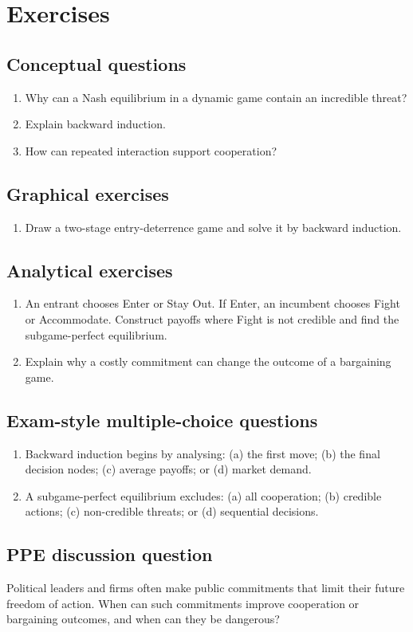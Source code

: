 \section*{Exercises}

\subsection*{Conceptual questions}
\begin{enumerate}[label=\arabic*.]
  \item Why can a Nash equilibrium in a dynamic game contain an incredible threat?
  \item Explain backward induction.
  \item How can repeated interaction support cooperation?
\end{enumerate}

\subsection*{Graphical exercises}
\begin{enumerate}[resume,label=\arabic*.]
  \item Draw a two-stage entry-deterrence game and solve it by backward induction.
\end{enumerate}

\subsection*{Analytical exercises}
\begin{enumerate}[resume,label=\arabic*.]
  \item An entrant chooses Enter or Stay Out. If Enter, an incumbent chooses Fight or Accommodate. Construct payoffs where Fight is not credible and find the subgame-perfect equilibrium.
  \item Explain why a costly commitment can change the outcome of a bargaining game.
\end{enumerate}

\subsection*{Exam-style multiple-choice questions}
\begin{enumerate}[resume,label=\arabic*.]
  \item Backward induction begins by analysing: (a) the first move; (b) the final decision nodes; (c) average payoffs; or (d) market demand.
  \item A subgame-perfect equilibrium excludes: (a) all cooperation; (b) credible actions; (c) non-credible threats; or (d) sequential decisions.
\end{enumerate}

\subsection*{PPE discussion question}

\noindent Political leaders and firms often make public commitments that limit their future freedom of action. When can such commitments improve cooperation or bargaining outcomes, and when can they be dangerous?
